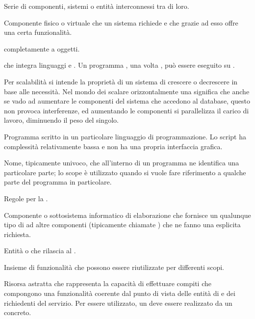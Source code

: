 {Serie di componenti, sistemi o entità interconnessi tra di loro.}

{Componente fisico o virtuale che un sistema richiede e che grazie ad esso offre una certa funzionalità.}

{ completamente a oggetti.}




{ che integra linguaggi  e . Un programma , una volta , può essere eseguito su .}

{Per scalabilità si intende la proprietà di un sistema di crescere o decrescere in base alle necessità. Nel mondo dei  scalare orizzontalmente una  significa che anche se vado ad aumentare le componenti del sistema che accedono al database, questo non provoca interferenze, ed aumentando le componenti si parallelizza il carico di lavoro, diminuendo il peso del singolo.}

{Programma scritto in un particolare linguaggio di programmazione. Lo script ha complessità relativamente bassa e non ha una propria interfaccia grafica.}

{Nome, tipicamente univoco, che all'interno di un programma ne identifica una particolare parte; lo scope è utilizzato quando si vuole fare riferimento a qualche parte del programma in particolare.}

{Regole per la .}

{Componente o sottosistema informatico di elaborazione che fornisce un qualunque tipo di  ad altre componenti (tipicamente chiamate ) che ne fanno una esplicita richiesta.}

{Entità  o  che rilascia  al .}

{Insieme di funzionalità  che possono essere riutilizzate per differenti scopi.}

{Risorsa astratta che rappresenta la capacità di effettuare compiti che compongono una funzionalità coerente dal punto di vista delle entità di  e dei richiedenti del servizio. Per essere utilizzato, un  deve essere realizzato da un  concreto.}

